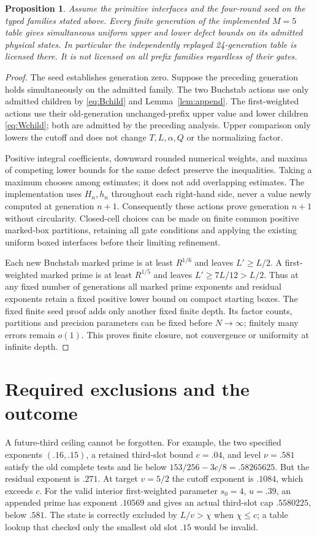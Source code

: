 \documentclass[11pt]{article}
\newtheorem{proposition}{Proposition}
\begin{document}
\begin{proposition}\label{prop:closure}
Assume the primitive interfaces and the four-round seed on the typed
families stated above. Every finite generation of the implemented
$M=5$ table gives simultaneous uniform upper and lower defect bounds
on its admitted physical states. In particular the independently
replayed 24-generation table is licensed there. It is not licensed
on all prefix families regardless of their gates.
\end{proposition}
\begin{proof}
The seed establishes generation zero. Suppose the preceding generation
holds simultaneously on the admitted family. The two Buchstab actions
use only admitted children by \eqref{eq:Bchild} and Lemma~\ref{lem:append}.
The first-weighted actions use their old-generation unchanged-prefix
upper value and lower children \eqref{eq:Wchild}; both are admitted by
the preceding analysis. Upper comparison only lowers the cutoff and
does not change $T,L,\alpha,Q$ or the normalizing factor.

Positive integral coefficients, downward rounded numerical weights,
and maxima of competing lower bounds for the same defect preserve
the inequalities. Taking a maximum chooses among estimates; it does
not add overlapping estimates. The implementation uses $H_n,h_n$
throughout each right-hand side, never a value newly computed at
generation $n+1$. Consequently these actions prove generation $n+1$
without circularity. Closed-cell choices can be made on finite common
positive marked-box partitions, retaining all gate conditions and
applying the existing uniform boxed interfaces before their limiting
refinement.

Each new Buchstab marked prime is at least $R^{1/6}$ and leaves
$L'\ge L/2$. A first-weighted marked prime is at least $R^{1/5}$ and
leaves $L'\ge7L/12>L/2$. Thus at any fixed number of generations all
marked prime exponents and residual exponents retain a fixed positive
lower bound on compact starting boxes. The fixed finite seed proof
adds only another fixed finite depth. Its factor counts, partitions
and precision parameters can be fixed before $N\to\infty$; finitely
many errors remain $o(1)$. This proves finite closure, not convergence
or uniformity at infinite depth.
\end{proof}

\section{Required exclusions and the outcome}
A future-third ceiling cannot be forgotten. For example, the two
specified exponents $(.16,.15)$, a retained third-slot bound $c=.04$,
and level $\nu=.581$ satisfy the old complete tests and lie below
$153/256-3c/8=.58265625$. But the residual exponent is $.271$.
At target $v=5/2$ the cutoff exponent is $.1084$, which exceeds $c$.
For the valid interior first-weighted parameter $s_0=4$, $u=.39$,
an appended prime has exponent $.10569$ and gives an actual third-slot
cap $.5580225$, below $.581$. The state is correctly excluded
by $L/v>\chi$ when $\chi\le c$; a table lookup that checked only the
smallest old slot $.15$ would be invalid.
\end{document}
